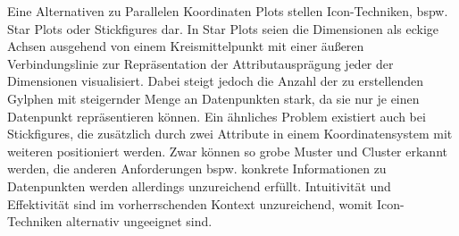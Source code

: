 \documentclass[usegeometry=true]{scrartcl}
\begin{document}
Eine Alternativen zu Parallelen Koordinaten Plots stellen Icon-Techniken, bspw. Star Plots oder Stickfigures dar.
In Star Plots seien die Dimensionen als eckige Achsen ausgehend von einem Kreismittelpunkt mit einer äußeren Verbindungslinie zur Repräsentation der Attributausprägung jeder der Dimensionen visualisiert.
Dabei steigt jedoch die Anzahl der zu erstellenden Gylphen mit steigernder Menge an Datenpunkten stark, da sie nur je einen Datenpunkt repräsentieren können.%
Ein ähnliches Problem existiert auch bei Stickfigures, die zusätzlich durch zwei Attribute in einem Koordinatensystem mit weiteren positioniert werden.
Zwar können so grobe Muster und Cluster erkannt werden, die anderen Anforderungen bspw. konkrete Informationen zu Datenpunkten werden allerdings unzureichend erfüllt.
Intuitivität und Effektivität sind im vorherrschenden Kontext unzureichend, womit Icon-Techniken alternativ ungeeignet sind. 




\end{document}
